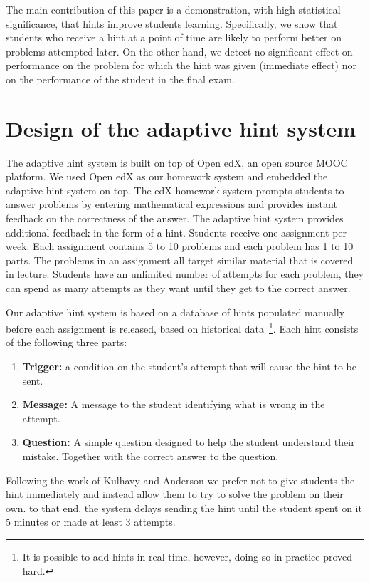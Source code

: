 \documentclass{llncs2e/llncs}
\begin{document}
The main contribution of this paper is a demonstration, with high
statistical significance, that hints improve students learning. Specifically, we show that students who receive a hint at
a point of time are likely to perform better on problems attempted
later. On the other hand, we detect no significant effect on
performance on the problem for which the hint was given (immediate effect) nor on the performance of the student in the final exam.


\section*{Design of the adaptive hint system}
The adaptive hint system is built on top of Open edX, an open source MOOC platform. We used Open edX as our homework system and embedded the adaptive hint system on top. The edX homework system prompts students to answer problems by entering mathematical expressions and provides instant feedback on the correctness of the answer. The adaptive hint system provides additional feedback in the form of a hint. Students receive one assignment per week. Each assignment contains 5 to 10 problems and each problem has 1 to 10 parts. The problems in an assignment all target similar material that is covered in lecture. Students have an unlimited number of attempts for each problem, they can spend as many attempts as they want until they get to the correct answer.

Our adaptive hint system is based on a database of hints populated manually before each assignment is released, based
on historical data~\footnote{It is possible to add hints in
real-time, however, doing so in practice proved hard.}. Each hint
consists of the following three parts:
\begin{enumerate}
\item {\bf Trigger:} a condition on the student's attempt that will
  cause the hint to be sent.
\item {\bf Message:} A message to the student identifying what is
  wrong in the attempt.
\item {\bf Question:} A simple question designed to help the student understand their mistake. Together with the correct answer to the question.   
\end{enumerate}


Following the work of Kulhavy and Anderson\cite{Kulhavy1972} we prefer not to give students the hint immediately and instead allow them to try to solve the problem on their own. to that end, the system delays sending the hint until the student spent on it 5 minutes or made at least 3 attempts.
\end{document}
